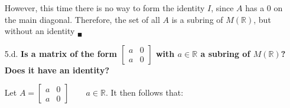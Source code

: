 \documentclass{article}
\begin{document}
\begin{enumerate}
			However, this time there is no way to form the identity $I$, since $A$ has a $0$ on the 
			main diagonal. Therefore, the set of all $A$ is a subring of $M(\mathbb{R})$, but 
			without an identity $_{\blacksquare}$

		\item [5.d.] \textbf{Is a matrix of the form $\begin{bmatrix} a & 0 \\ a & 0 \end{bmatrix}$ 
						with $a \in \mathbb{R}$ a subring of $M(\mathbb{R})$? \\
						Does it have an identity?}

			Let $A = \begin{bmatrix} a & 0 \\ a & 0 \end{bmatrix} \qquad a \in \mathbb{R}$. It then 
			follows that:


\end{enumerate}
\end{document}
